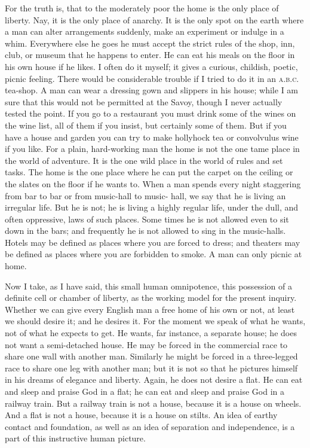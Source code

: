 \documentclass[final,10pt,letterpaper,twocolumn,openany]{book}
\begin{document}
For the truth is, that to the moderately poor the home is the only place
of liberty. Nay, it is the only place of anarchy. It is the only spot on the
earth where a man can alter arrangements suddenly, make an experiment
or indulge in a whim. Everywhere else he goes he must accept the strict
rules of the shop, inn, club, or museum that he happens to enter. He can
eat his meals on the floor in his own house if he likes. I often do it myself;
it gives a curious, childish, poetic, picnic feeling. There would be
considerable trouble if I tried to do it in an \textsc{a.b.c.} tea-shop. A man can
wear a dressing gown and slippers in his house; while I am sure that this
would not be permitted at the Savoy, though I never actually tested the
point. If you go to a restaurant you must drink some of the wines on the
wine list, all of them if you insist, but certainly some of them. But if you
have a house and garden you can try to make hollyhock tea or convolvulus
wine if you like. For a plain, hard-working man the home is not the one
tame place in the world of adventure. It is the one wild place in the world
of rules and set tasks. The home is the one place where he can put the
carpet on the ceiling or the slates on the floor if he wants to. When a man
spends every night staggering from bar to bar or from music-hall to music-
hall, we say that he is living an irregular life. But he is not; he is living a
highly regular life, under the dull, and often oppressive, laws of such
places. Some times he is not allowed even to sit down in the bars; and
frequently he is not allowed to sing in the music-halls. Hotels may be
defined as places where you are forced to dress; and theaters may be
defined as places where you are forbidden to smoke. A man can only
picnic at home.

Now I take, as I have said, this small human omnipotence, this
possession of a definite cell or chamber of liberty, as the working model
for the present inquiry. Whether we can give every English man a free
home of his own or not, at least we should desire it; and he desires it. For
the moment we speak of what he wants, not of what he expects to get. He
wants, far instance, a separate house; he does not want a semi-detached
house. He may be forced in the commercial race to share one wall with
another man. Similarly he might be forced in a three-legged race to share
one leg with another man; but it is not so that he pictures himself in his
dreams of elegance and liberty. Again, he does not desire a flat. He can eat
and sleep and praise God in a flat; he can eat and sleep and praise God in a
railway train. But a railway train is not a house, because it is a house on
wheels. And a flat is not a house, because it is a house on stilts. An idea of
earthy contact and foundation, as well as an idea of separation and
independence, is a part of this instructive human picture.
\end{document}
